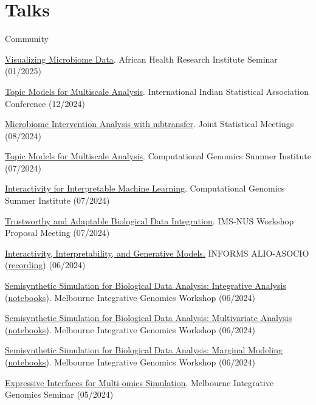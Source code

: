 \documentclass[letterpaper]{article}
\renewenvironment{itemize}{
  \begin{list}{}{
    \setlength{\leftmargin}{1.5em}
  }
}{
  \end{list}
}
\begin{document}
\section*{Talks}
Community
\begin{itemize}
  \item \href{https://krisrs1128.github.io/talks/2025/20250115/20250115.html}{Visualizing Microbiome Data}. African Health Research Institute Seminar (01/2025)
  \item \href{https://go.wisc.edu/337726}{Topic Models for Multiscale Analysis}. International Indian Statistical Association Conference (12/2024)
  \item \href{https://go.wisc.edu/h5ow0o}{Microbiome Intervention Analysis with mbtransfer}. Joint Statistical Meetings (08/2024)
  \item \href{https://go.wisc.edu/6y38gg}{Topic Models for Multiscale Analysis}. Computational Genomics Summer Institute (07/2024)
  \item \href{https://go.wisc.edu/pl9a65}{Interactivity for Interpretable Machine Learning}. Computational Genomics Summer Institute (07/2024)
  \item \href{https://go.wisc.edu/8k8r2q}{Trustworthy and Adaptable Biological Data Integration}. IMS-NUS Workshop Proposal Meeting (07/2024)
  \item \href{https://go.wisc.edu/3u4m16}{Interactivity, Interpretability, and Generative Models.} INFORMS ALIO-ASOCIO (\href{https://www.youtube.com/watch?v=UaYfwzkWq1Q&feature=youtu.be}{recording}) (06/2024)
  \item \href{https://go.wisc.edu/54tmr9}{Semisynthetic Simulation for Biological Data Analysis: Integrative Analysis} (\href{https://github.com/krisrs1128/intro-to-simulation/}{notebooks}). Melbourne Integrative Genomics Workshop (06/2024)
  \item \href{https://go.wisc.edu/rc776i}{Semisynthetic Simulation for Biological Data Analysis: Multivariate Analysis} (\href{https://github.com/krisrs1128/intro-to-simulation/}{notebooks}). Melbourne Integrative Genomics Workshop (06/2024)
  \item \href{https://go.wisc.edu/gfj36r}{Semisynthetic Simulation for Biological Data Analysis: Marginal Modeling} (\href{https://github.com/krisrs1128/intro-to-simulation/}{notebooks}). Melbourne Integrative Genomics Workshop (06/2024)
  \item \href{https://krisrs1128.github.io/talks/2024/20240531/20240531.html#1}{Expressive Interfaces for Multi-omics Simulation}. Melbourne Integrative Genomics Seminar (05/2024)

\end{itemize}
\end{document}
